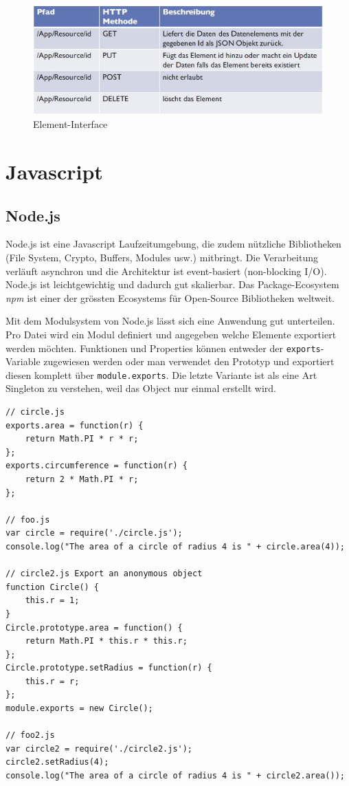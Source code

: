\begin{figure}[h!]
\centering
\includegraphics[width=0.7\linewidth]{fig/rest-element-interface}
\caption{Element-Interface}
\label{fig:rest-element-interface}
\end{figure}

\newpage

\section{Javascript}

\subsection{Node.js}

Node.js ist eine Javascript Laufzeitumgebung, die zudem nützliche Bibliotheken (File System, Crypto, Buffers, Modules usw.) mitbringt. Die Verarbeitung verläuft asynchron und die Architektur ist event-basiert (non-blocking I/O). Node.js ist leichtgewichtig und dadurch gut skalierbar. Das Package-Ecosystem \textit{npm} ist einer der grössten Ecosystems für Open-Source Bibliotheken weltweit.

Mit dem Modulsystem von Node.js lässt sich eine Anwendung gut unterteilen. Pro Datei wird ein Modul definiert und angegeben welche Elemente exportiert werden möchten. Funktionen und Properties können entweder der \lstinline|exports|-Variable zugewiesen werden oder man verwendet den Prototyp und exportiert diesen komplett über \lstinline|module.exports|. Die letzte Variante ist als eine Art Singleton zu verstehen, weil das Object nur einmal erstellt wird.

\begin{lstlisting}[caption=Module in Node.js]
// circle.js
exports.area = function(r) {
	return Math.PI * r * r;
};
exports.circumference = function(r) {
	return 2 * Math.PI * r;
};

// foo.js
var circle = require('./circle.js');
console.log("The area of a circle of radius 4 is " + circle.area(4));

// circle2.js Export an anonymous object
function Circle() {
	this.r = 1;
}
Circle.prototype.area = function() {
	return Math.PI * this.r * this.r;
};
Circle.prototype.setRadius = function(r) {
	this.r = r;
};
module.exports = new Circle();

// foo2.js
var circle2 = require('./circle2.js');
circle2.setRadius(4);
console.log("The area of a circle of radius 4 is " + circle2.area());
\end{lstlisting}

